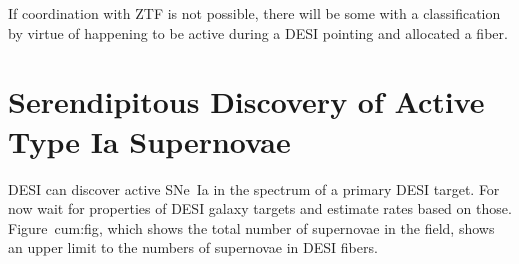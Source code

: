 \documentclass{article}   	%
\begin{document}
If coordination with
ZTF is not possible, there will be some with a classification by virtue of happening to be active during a DESI pointing and allocated a fiber.




\section{Serendipitous Discovery of Active Type Ia Supernovae}
DESI can discover active SNe~Ia in the spectrum of a primary DESI target.
For now wait for properties of DESI galaxy targets and estimate rates based on those.  Figure~{cum:fig}, which shows the total number of 
supernovae in the field, shows an upper limit to the numbers of supernovae in DESI fibers.
\end{document}
